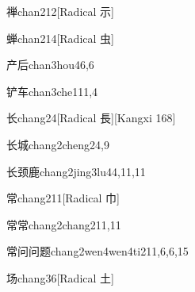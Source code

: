 \begin{verbete}{禅}{chan2}{12}[Radical 示]
\end{verbete}

\begin{verbete}{蝉}{chan2}{14}[Radical 虫]
\end{verbete}

\begin{verbete}{产后}{chan3hou4}{6,6}
\end{verbete}

\begin{verbete}{铲车}{chan3che1}{11,4}
\end{verbete}

\begin{verbete}{长}{chang2}{4}[Radical 長][Kangxi 168]
\end{verbete}

\begin{verbete}{长城}{chang2cheng2}{4,9}
\end{verbete}

\begin{verbete}{长颈鹿}{chang2jing3lu4}{4,11,11}
\end{verbete}

\begin{verbete}{常}{chang2}{11}[Radical 巾]
\end{verbete}

\begin{verbete}{常常}{chang2chang2}{11,11}
\end{verbete}

\begin{verbete}{常问问题}{chang2wen4wen4ti2}{11,6,6,15}
\end{verbete}

\begin{verbete}{场}{chang3}{6}[Radical ⼟]
\end{verbete}


